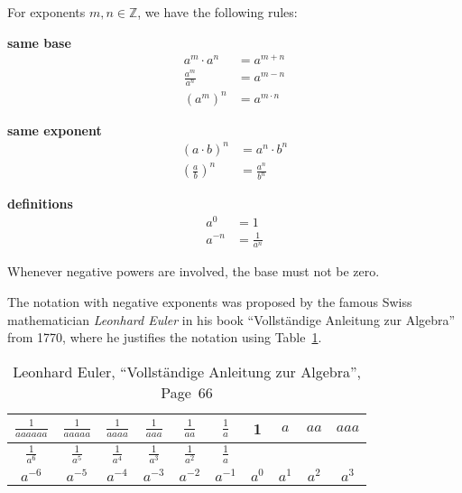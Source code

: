 \begin{tcolorbox}
	For exponents $m,n\in\mathbb Z$, we have the following rules:
	\begin{multicols}{3}
		\centering
		\textbf{same base}\\
		\begin{align*}
			a^m\cdot a^n&=a^{m+n} \\[10pt]
			\frac{a^m}{a^n}&=a^{m-n} \\[10pt]
			\left(a^m\right)^n&=a^{m\cdot n}
		\end{align*}
		\vfill
		\columnbreak

		\textbf{same exponent}\\
		\begin{align*}
			\left(a\cdot b\right)^n&=a^n\cdot b^n \\[10pt]
			\left(\frac{a}{b}\right)^n&=\frac{a^n}{b^n}
		\end{align*}
		\vfill
		\columnbreak

		\textbf{definitions}\\
		\begin{align*}
			a^0&=1 \\[10pt]
			a^{-n}&=\frac{1}{a^n}
		\end{align*}
		\vfill
	\end{multicols}
	Whenever negative powers are involved, the base must not be zero.
\end{tcolorbox}
The notation with negative exponents was proposed by the famous Swiss mathematician \textit{Leonhard Euler} in his book ``Vollständige Anleitung zur Algebra'' from 1770, where he justifies the notation using Table~\ref{tab:euler_powers}.
\begin{table}[ht]
	\centering
	\renewcommand{\arraystretch}{1.5}
	\begin{tabular}{|c|c|c|c|c|c|c|c|c|c|} \hline
		$\frac{1}{aaaaaa}$ & $\frac{1}{aaaaa}$ & $\frac{1}{aaaa}$ & $\frac{1}{aaa}$ & $\frac{1}{aa}$ & $\frac{1}{a}$ & 1 & $a$ & $aa$ & $aaa$ \\ \hline
		$\frac{1}{a^6}$ & $\frac{1}{a^5}$ & $\frac{1}{a^4}$ & $\frac{1}{a^3}$ & $\frac{1}{a^2}$ & $\frac{1}{a}$ & & & & \\ \hline
		$a^{-6}$ & $a^{-5}$ & $a^{-4}$ & $a^{-3}$ & $a^{-2}$ & $a^{-1}$ & $a^0$ & $a^1$ & $a^2$ & $a^3$ \\ \hline
	\end{tabular}
	\caption{Leonhard Euler, ``Vollständige Anleitung zur Algebra'', Page~66}
	\label{tab:euler_powers}
\end{table}
